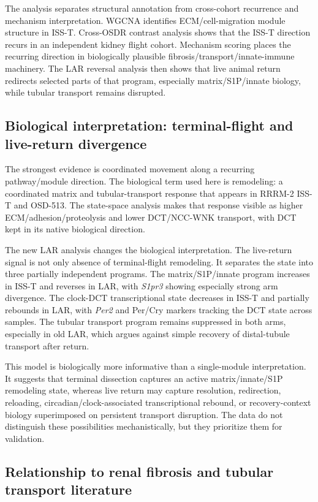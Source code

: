 \documentclass[11pt]{article}
\newcommand{\gene}[1]{\textit{#1}}
\begin{document}
The analysis separates structural annotation from cross-cohort recurrence and mechanism interpretation. WGCNA identifies ECM/cell-migration module structure in ISS-T. Cross-OSDR contrast analysis shows that the ISS-T direction recurs in an independent kidney flight cohort. Mechanism scoring places the recurring direction in biologically plausible fibrosis/transport/innate-immune machinery. The LAR reversal analysis then shows that live animal return redirects selected parts of that program, especially matrix/S1P/innate biology, while tubular transport remains disrupted.

\subsection{Biological interpretation: terminal-flight and live-return divergence}

The strongest evidence is coordinated movement along a recurring pathway/module direction. The biological term used here is remodeling: a coordinated matrix and tubular-transport response that appears in RRRM-2 ISS-T and OSD-513. The state-space analysis makes that response visible as higher ECM/adhesion/proteolysis and lower DCT/NCC-WNK transport, with DCT kept in its native biological direction.

The new LAR analysis changes the biological interpretation. The live-return signal is not only absence of terminal-flight remodeling. It separates the state into three partially independent programs. The matrix/S1P/innate program increases in ISS-T and reverses in LAR, with \gene{S1pr3} showing especially strong arm divergence. The clock-DCT transcriptional state decreases in ISS-T and partially rebounds in LAR, with \gene{Per2} and Per/Cry markers tracking the DCT state across samples. The tubular transport program remains suppressed in both arms, especially in old LAR, which argues against simple recovery of distal-tubule transport after return.

This model is biologically more informative than a single-module interpretation. It suggests that terminal dissection captures an active matrix/innate/S1P remodeling state, whereas live return may capture resolution, redirection, reloading, circadian/clock-associated transcriptional rebound, or recovery-context biology superimposed on persistent transport disruption. The data do not distinguish these possibilities mechanistically, but they prioritize them for validation.

\subsection{Relationship to renal fibrosis and tubular transport literature}
\end{document}
